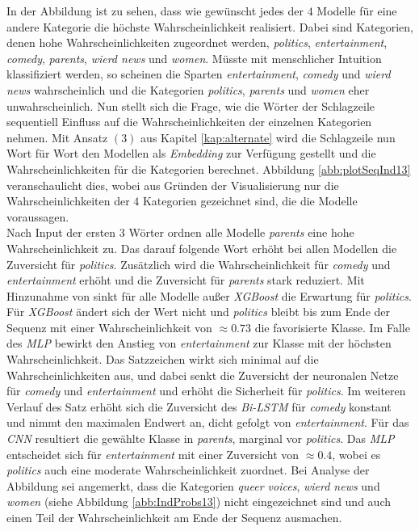\documentclass[a4paper,11pt]{article}
\begin{document}
In der Abbildung ist zu sehen, dass wie gewünscht jedes der $4$ Modelle für eine andere Kategorie die höchste Wahrscheinlichkeit realisiert. Dabei sind Kategorien, denen hohe Wahrscheinlichkeiten zugeordnet werden, \textit{politics}, \textit{entertainment}, \textit{comedy}, \textit{parents}, \textit{wierd news} und \textit{women}. Müsste mit menschlicher Intuition klassifiziert werden, so scheinen die Sparten \textit{entertainment}, \textit{comedy} und \textit{wierd news} wahrscheinlich und die Kategorien \textit{politics}, \textit{parents} und \textit{women} eher unwahrscheinlich. Nun stellt sich die Frage, wie die Wörter der Schlagzeile sequentiell Einfluss auf die Wahrscheinlichkeiten der einzelnen Kategorien nehmen. Mit Ansatz $(3)$ aus Kapitel \ref{kap:alternate} wird die Schlagzeile nun Wort für Wort den Modellen als \textit{Embedding} zur Verfügung gestellt und die Wahrscheinlichkeiten für die Kategorien berechnet. Abbildung \ref{abb:plotSeqInd13} veranschaulicht dies, wobei aus Gründen der Visualisierung nur die Wahrscheinlichkeiten der $4$ Kategorien gezeichnet sind, die die Modelle voraussagen.\\
Nach Input der ersten $3$ Wörter  ordnen alle Modelle \textit{parents} eine hohe Wahrscheinlichkeit zu. Das darauf folgende Wort  erhöht bei allen Modellen die Zuversicht für \textit{politics}. Zusätzlich wird die Wahrscheinlichkeit für \textit{comedy} und \textit{entertainment} erhöht und die Zuversicht für \textit{parents} stark reduziert. Mit Hinzunahme von  sinkt für alle Modelle außer \textit{XGBoost} die Erwartung für \textit{politics}. Für \textit{XGBoost} ändert sich der Wert nicht und \textit{politics} bleibt bis zum Ende der Sequenz mit einer Wahrscheinlichkeit von $\approx 0.73$ die favorisierte Klasse. Im Falle des \textit{MLP} bewirkt  den Anstieg von \textit{entertainment} zur Klasse mit der höchsten Wahrscheinlichkeit. Das Satzzeichen \say{\textit{,}} wirkt sich minimal auf die Wahrscheinlichkeiten aus, und dabei senkt die Zuversicht der neuronalen Netze für \textit{comedy} und \textit{entertainment} und erhöht die Sicherheit für \textit{politics}. Im weiteren Verlauf des Satz erhöht sich die Zuversicht des \textit{Bi-LSTM} für \textit{comedy} konstant und nimmt den maximalen Endwert an, dicht gefolgt von \textit{entertainment}. Für das \textit{CNN} resultiert die gewählte Klasse in \textit{parents}, marginal vor \textit{politics}. Das \textit{MLP} entscheidet sich für \textit{entertainment} mit einer Zuversicht von $\approx 0.4$, wobei es \textit{politics} auch eine moderate Wahrscheinlichkeit zuordnet. Bei Analyse der Abbildung sei angemerkt, dass die Kategorien \textit{queer voices}, \textit{wierd news} und \textit{women} (siehe Abbildung \ref{abb:IndProbs13}) nicht eingezeichnet sind und auch einen Teil der Wahrscheinlichkeit am Ende der Sequenz ausmachen.\\
\end{document}

